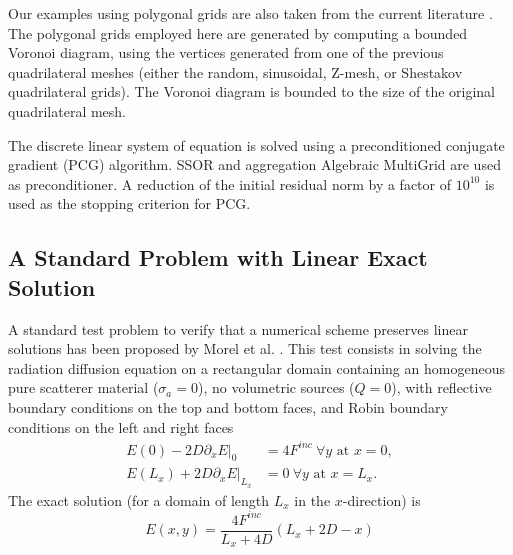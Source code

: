 \documentclass[preprint,10pt]{elsarticle}
\begin{document}
Our examples using polygonal grids are also taken from the current literature 
\cite{Kuznetsov2004,Brezzi2005,BaileyAdams2008}.
The polygonal grids employed here are generated by computing a bounded Voronoi diagram, using the 
vertices generated from one of the previous quadrilateral meshes (either the random, sinusoidal, Z-mesh, 
or Shestakov quadrilateral grids). The Voronoi diagram is bounded to the size of the original 
quadrilateral mesh.

The discrete linear system of equation is solved using a preconditioned conjugate gradient (PCG) algorithm. 
SSOR and aggregation Algebraic MultiGrid \cite{agmg}  are used as preconditioner. A reduction of the
initial residual norm by a factor of $10^{10}$ is used as the stopping criterion for PCG. 

\subsection{A Standard Problem with Linear Exact Solution}
A standard test problem to verify that a numerical scheme preserves linear solutions has been
proposed by Morel et al. \cite{Morel1992}. This test consists
in solving the radiation diffusion equation on a rectangular domain containing an homogeneous pure 
scatterer material ($\sigma_a=0$), no volumetric sources ($Q=0$), with reflective boundary conditions 
on the top and bottom faces, and Robin boundary conditions on the left and right faces
\begin{align}
  E(0) - 2 D \left.\partial_x E\right|_0 &= 4F^{inc} \ \forall y \textrm{ at } x=0, \\
  E(L_x) + 2 D \left.\partial_x E\right|_{L_x} &= 0 \ \forall y \textrm{ at } x=L_x.
\end{align}
The exact solution (for a domain of length $L_x$ in the $x$-direction) is
\begin{equation}
E(x,y) = 	\frac{4F^{inc}}{L_x+4D}\left(L_x+2D-x \right)
\end{equation}
\end{document}
